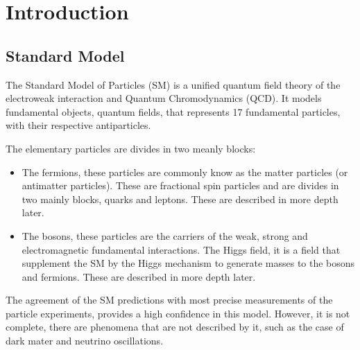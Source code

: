 \chapter{Introduction}
\minitoc
\label{Cap:Int}
% 
\section{Standard Model}
The Standard Model of Particles (SM) is a unified quantum field theory of the electroweak interaction and Quantum Chromodynamics (QCD). It models fundamental objects, quantum fields, that represents 17 fundamental particles, with their respective antiparticles.

The elementary particles are divides in two meanly blocks: 
\begin{itemize}
    \item The fermions, these particles are commonly know as the matter particles (or antimatter particles). These are fractional spin particles and are divides in two mainly blocks, quarks and leptons. These are described in more depth later. 
    \item The bosons, these particles are the carriers of the weak, strong and electromagnetic fundamental interactions. The Higgs field, it is a field that supplement the SM by the Higgs mechanism to generate masses to the bosons and fermions. These are described in more depth later.
\end{itemize}

The agreement of the SM predictions with most precise measurements of the particle experiments, provides a high confidence in this model. However, it is not complete, there are phenomena that are not described by it, such as the case of dark mater and neutrino oscillations.

